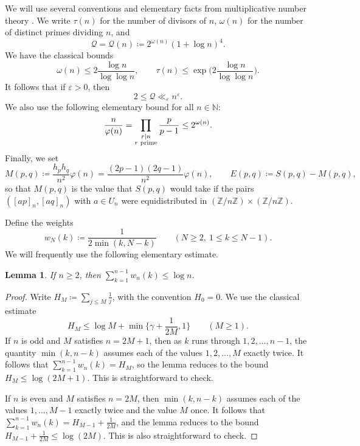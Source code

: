 \documentclass[12pt]{amsart}
\newtheorem{lemma}[theorem]{Lemma}
\theoremstyle{definition}
\newcommand{\Z}{\mathbb{Z}}
\begin{document}
We will use several conventions and elementary facts from multiplicative number theory \cite{HW}.  We write $\tau(n)$ for the number of divisors
of $n$, $\omega(n)$ for the number of distinct primes dividing $n$, and
\[
\mathcal{Q} = \mathcal{Q}(n)\coloneq 2^{\omega(n)}(1+\log n)^4 .
\]
We have the classical bounds
\[
\omega(n)\leq 2\frac{\log n}{\log\log n},\qquad \tau(n)\leq \exp\Big(2\frac{\log n}{\log\log n}\Big).
\]
It follows that if $\varepsilon>0$, then
\begin{equation}
\label{eqn:Q_small}
2\le\mathcal{Q}\ll_{\varepsilon}n^{\varepsilon}.
\end{equation}
We also use the following elementary bound for all $n\in\mathbb{N}$:
\begin{equation}
\label{eqn:phi_lower}
\frac{n}{\varphi(n)}=\prod_{\substack{r\mid n \\ \textup{$r$ prime}}}\frac{p}{p-1}\leq 2^{\omega(n)}.
\end{equation}
Finally, we set
\[
M(p,q)\coloneq \frac{h_ph_q}{n^2}\varphi(n)=\frac{(2p-1)(2q-1)}{n^2}\varphi(n),
\qquad E(p,q)\coloneq S(p,q)-M(p,q),
\]
so that $M(p,q)$ is the value that $S(p,q)$ would take if the pairs $([ap]_n,[aq]_n)$ with
$a\in U_n$ were equidistributed in $(\Z/n\Z)\times(\Z/n\Z)$.


Define the weights
\[
w_N(k)\coloneq \frac{1}{2\min(k,N-k)}\qquad (N\ge 2,\ 1\le k\le N-1).
\]
We will frequently use the following elementary estimate.

\begin{lemma}
\label{lem:harmonic}
If $n\ge 2$, then $\sum_{k=1}^{n-1}w_n(k)\le \log n$.
\end{lemma}

\begin{proof}
Write $H_M\coloneq\sum_{j\le M}\frac1j$, with the convention $H_0=0$.  We use the classical estimate
\begin{equation}
\label{eqn:harmonic_number}
H_M\le \log M+\min\Big\{\gamma+\frac{1}{2M},1\Big\}\qquad(M\ge 1).
\end{equation}
If $n$ is odd and $M$ satisfies $n=2M+1$, then as $k$ runs through $1,2,\dots,n-1$, the quantity $\min(k,n-k)$ assumes each of the values $1,2,\dots,M$ exactly twice.  It follows that $\sum_{k=1}^{n-1}w_n(k)=H_M$, so the lemma reduces to the bound $H_M\le\log(2M+1)$.  This is straightforward to check.

If $n$ is even and $M$ satisfies $n=2M$, then $\min(k,n-k)$ assumes each of the values $1,\dots,M-1$ exactly twice and the value $M$ once.  It follows that $\sum_{k=1}^{n-1}w_n(k)=H_{M-1}+\frac{1}{2M}$, and the lemma reduces to the bound $H_{M-1}+\frac{1}{2M}\le\log(2M)$.  This is also straightforward to check.
\end{proof}
\end{document}
